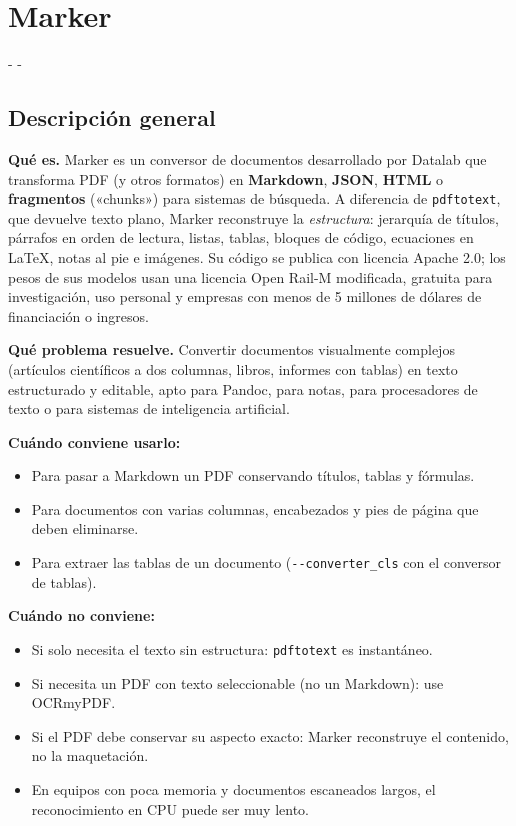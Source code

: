 \documentclass[11pt,a4paper]{article}
\makeatletter
\newcommand{\necesitaespacio}[1]{\par\penalty-100\begingroup
	\setlength{\dimen@}{#1}\dimen@ii\pagegoal\advance\dimen@ii-\pagetotal
	\ifdim\dimen@>\dimen@ii\ifdim\dimen@ii>\z@\vfil\fi\penalty-\@M\fi\endgroup}
\newcommand{\cmd}[1]{\texttt{\textcolor{colcmd}{#1}}}      %
\newcommand{\opt}[1]{\texttt{\textcolor{colopt}{#1}}}      %
\makeatother
\begin{document}
	\section{Marker}\label{sec:marker}
	
	\necesitaespacio{8\baselineskip}
	\subsection{Descripción general}
	
	\textbf{Qué es.} Marker es un conversor de documentos desarrollado por Datalab que transforma PDF (y otros formatos) en \textbf{Markdown}, \textbf{JSON}, \textbf{HTML} o \textbf{fragmentos} («chunks») para sistemas de búsqueda. A diferencia de \cmd{pdftotext}, que devuelve texto plano, Marker reconstruye la \emph{estructura}: jerarquía de títulos, párrafos en orden de lectura, listas, tablas, bloques de código, ecuaciones en LaTeX, notas al pie e imágenes. Su código se publica con licencia Apache 2.0; los pesos de sus modelos usan una licencia Open Rail-M modificada, gratuita para investigación, uso personal y empresas con menos de 5 millones de dólares de financiación o ingresos.
	
	\textbf{Qué problema resuelve.} Convertir documentos visualmente complejos (artículos científicos a dos columnas, libros, informes con tablas) en texto estructurado y editable, apto para Pandoc, para notas, para procesadores de texto o para sistemas de inteligencia artificial.
	
	\textbf{Cuándo conviene usarlo:}
	\begin{itemize}
		\item Para pasar a Markdown un PDF conservando títulos, tablas y fórmulas.
		\item Para documentos con varias columnas, encabezados y pies de página que deben eliminarse.
		\item Para extraer las tablas de un documento (\opt{-{}-converter\_\allowbreak{}cls} con el conversor de tablas).
	\end{itemize}
	
	\textbf{Cuándo no conviene:}
	\begin{itemize}
		\item Si solo necesita el texto sin estructura: \cmd{pdftotext} es instantáneo.
		\item Si necesita un PDF con texto seleccionable (no un Markdown): use OCRmyPDF.
		\item Si el PDF debe conservar su aspecto exacto: Marker reconstruye el contenido, no la maquetación.
		\item En equipos con poca memoria y documentos escaneados largos, el reconocimiento en CPU puede ser muy lento.
	\end{itemize}
	
\end{document}
